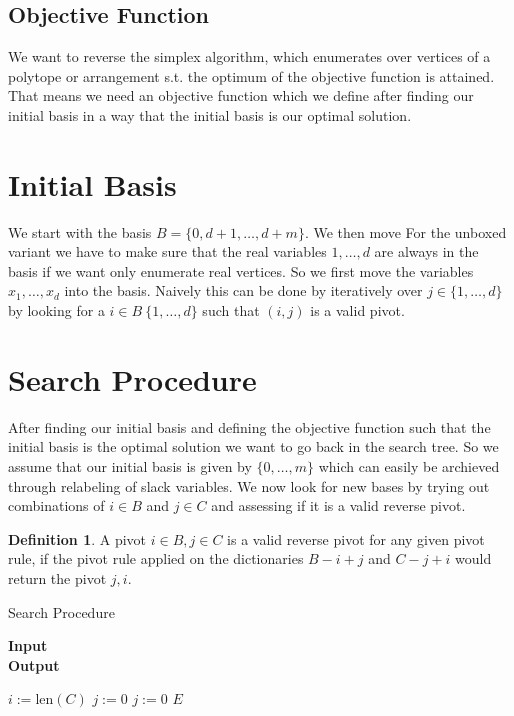 \documentclass[]{article}
\theoremstyle{definition}
\newtheorem{definition}{Definition}[section]
\theoremstyle{remark}
\begin{document}
\subsection{Objective Function}
We want to reverse the simplex algorithm, which enumerates over vertices of a polytope or arrangement s.t. the optimum of the objective function is attained. That means we need an objective function which we define after finding our initial basis in a way that the initial basis is our optimal solution.
\section{Initial Basis}
We start with the basis $B = \{0, d+1, \dots , d+m\}$. We then move For the unboxed variant we have to make sure that the real variables $1, \dots , d$ are always in the basis if we want only enumerate real vertices. So we first move the variables $x_1, \dots, x_d$ into the basis. Naively this can be done by iteratively over $j \in \{1,\dots ,d\}$ by looking for a $i \in B \ \{1,\dots,d\}$  such that  $(i,j)$ is a valid pivot.
\section{Search Procedure}
After finding our initial basis and defining the objective function such that the initial basis is the optimal solution we want to go back in the search tree. So we assume that our initial basis is given by $\{0, \dots, m\}$ which can easily be archieved through relabeling of slack variables. We now look for new bases by trying out combinations of $i \in B$ and $j \in C$ and assessing if it is a valid reverse pivot.
\begin{definition}
A pivot $i \in B, j \in C$  is a valid reverse pivot for any given pivot rule, if the pivot rule applied on the dictionaries $B - i + j$ and $C-j+i$ would return the pivot $j, i$.
\end{definition}
\begin{algorithm}
\caption{Search Procedure}
\hspace*{\algorithmicindent} \textbf{Input}\\
\hspace*{\algorithmicindent} \textbf{Output}
\begin{algorithmic}[1]
\State $i := \text{len}(C)$
\State $j := 0$
\State $j := 0$
\EndWhile
\EndWhile
\Return $E$
\end{algorithmic}
\end{algorithm}
\end{document}
